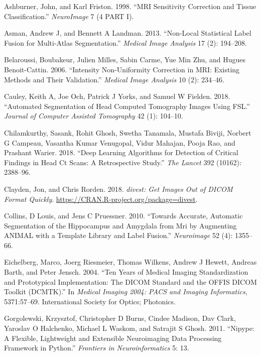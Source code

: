 \documentclass[]{elsarticle} %
\begin{document}
\leavevmode\hypertarget{ref-ashburner1998mri}{}%
Ashburner, John, and Karl Friston. 1998. ``MRI Sensitivity Correction and Tissue Classification.'' \emph{NeuroImage} 7 (4 PART I).

\leavevmode\hypertarget{ref-asman2013non}{}%
Asman, Andrew J, and Bennett A Landman. 2013. ``Non-Local Statistical Label Fusion for Multi-Atlas Segmentation.'' \emph{Medical Image Analysis} 17 (2): 194--208.

\leavevmode\hypertarget{ref-belaroussi2006intensity}{}%
Belaroussi, Boubakeur, Julien Milles, Sabin Carme, Yue Min Zhu, and Hugues Benoit-Cattin. 2006. ``Intensity Non-Uniformity Correction in MRI: Existing Methods and Their Validation.'' \emph{Medical Image Analysis} 10 (2): 234--46.

\leavevmode\hypertarget{ref-biasct}{}%
Cauley, Keith A, Joe Och, Patrick J Yorks, and Samuel W Fielden. 2018. ``Automated Segmentation of Head Computed Tomography Images Using FSL.'' \emph{Journal of Computer Assisted Tomography} 42 (1): 104--10.

\leavevmode\hypertarget{ref-cq500}{}%
Chilamkurthy, Sasank, Rohit Ghosh, Swetha Tanamala, Mustafa Biviji, Norbert G Campeau, Vasantha Kumar Venugopal, Vidur Mahajan, Pooja Rao, and Prashant Warier. 2018. ``Deep Learning Algorithms for Detection of Critical Findings in Head Ct Scans: A Retrospective Study.'' \emph{The Lancet} 392 (10162): 2388--96.

\leavevmode\hypertarget{ref-divest}{}%
Clayden, Jon, and Chris Rorden. 2018. \emph{divest: Get Images Out of DICOM Format Quickly}. \url{https://CRAN.R-project.org/package=divest}.

\leavevmode\hypertarget{ref-collins2010towards}{}%
Collins, D Louis, and Jens C Pruessner. 2010. ``Towards Accurate, Automatic Segmentation of the Hippocampus and Amygdala from Mri by Augmenting ANIMAL with a Template Library and Label Fusion.'' \emph{Neuroimage} 52 (4): 1355--66.

\leavevmode\hypertarget{ref-dcmtk}{}%
Eichelberg, Marco, Joerg Riesmeier, Thomas Wilkens, Andrew J Hewett, Andreas Barth, and Peter Jensch. 2004. ``Ten Years of Medical Imaging Standardization and Prototypical Implementation: The DICOM Standard and the OFFIS DICOM Toolkit (DCMTK).'' In \emph{Medical Imaging 2004: PACS and Imaging Informatics}, 5371:57--69. International Society for Optics; Photonics.

\leavevmode\hypertarget{ref-nipype}{}%
Gorgolewski, Krzysztof, Christopher D Burns, Cindee Madison, Dav Clark, Yaroslav O Halchenko, Michael L Waskom, and Satrajit S Ghosh. 2011. ``Nipype: A Flexible, Lightweight and Extensible Neuroimaging Data Processing Framework in Python.'' \emph{Frontiers in Neuroinformatics} 5: 13.
\end{document}
